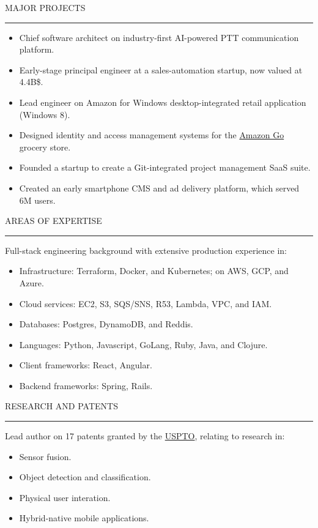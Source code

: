 \documentclass[12pt]{article}
\newcommand{\blockseparation}{\vspace{0.13in}}
\newcommand{\heading}[1]{
	\vspace{0.05in}
	\uppercase{#1}
	\vspace{0.05in}
	\hrule
	\blockseparation
}
\newenvironment{tightbullets}
{\begin{itemize}}
{\end{itemize}}
\newenvironment{bullets}
{\begin{tightbullets}}
{\end{tightbullets} \blockseparation}
\begin{document}
\begin{flushleft}
\heading{Major Projects}
\begin{bullets}
	\item Chief software architect on industry-first AI-powered PTT communication platform.
	\item Early-stage principal engineer at a sales-automation startup, now valued at 4.4B\$.
	\item Lead engineer on Amazon for Windows desktop-integrated retail application (Windows 8).
	\item Designed identity and access management systems for the \href{https://www.amazon.com/b?ie=UTF8\&node=16008589011}{Amazon Go} grocery store.
	\item Founded a startup to create a Git-integrated project management SaaS suite.
	\item Created an early smartphone CMS and ad delivery platform, which served 6M users.
\end{bullets}


\heading{Areas of Expertise}
\vspace{0.075in}
\hspace{0.175in}
Full-stack engineering background with extensive production experience in:
\vspace{0.1in}
\begin{bullets}
	\item Infrastructure: Terraform, Docker, and Kubernetes; on AWS, GCP, and Azure.
	\item Cloud services: EC2, S3, SQS/SNS, R53, Lambda, VPC, and IAM.
	\item Databases: Postgres, DynamoDB, and Reddis.
	\item Languages: Python, Javascript, GoLang, Ruby, Java, and Clojure.
	\item Client frameworks: React, Angular.
	\item Backend frameworks: Spring, Rails.
\end{bullets}


\heading{Research and Patents}
\vspace{0.075in}
\hspace{0.175in}
Lead author on 17 patents granted by the \href{https://patents.google.com/?inventor=McNamara+Alexander+Michael}{USPTO}, relating to research in:
\vspace{0.1in}
\begin{bullets}
	\item Sensor fusion.
	\item Object detection and classification.
	\item Physical user interation.
	\item Hybrid-native mobile applications.
\end{bullets}


\end{flushleft}
\end{document}
